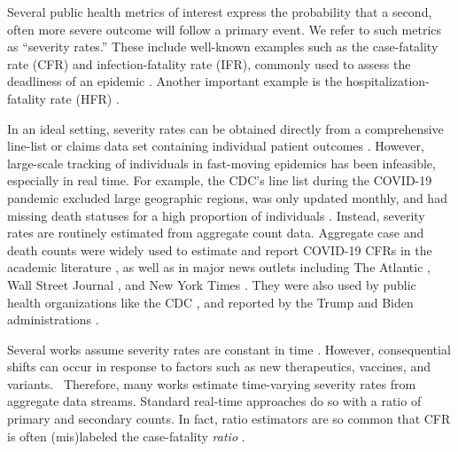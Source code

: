\documentclass{article}
\begin{document}
Several public health metrics of interest express the probability that a second,
often more severe outcome will follow a primary event. 
We refer to such metrics as ``severity rates.''
These include well-known examples such as the case-fatality rate (CFR) and infection-fatality rate (IFR), commonly used to assess the deadliness of an epidemic \citep{nishiuraEx1, nishiuraEx2, timevar_ifr, lancet_ifr}. 
Another important example 
is the hospitalization-fatality rate (HFR) \citep{HFR_linelist3, HFR_linelist1,  
  HFR_linelist2}.

In an ideal setting, severity rates can be obtained directly from a
comprehensive line-list or claims data set containing individual patient
outcomes \citep{HFR_linelist3, cfr_line_list}.
However, large-scale tracking of individuals in fast-moving epidemics
has been infeasible, especially in real time. 
For example, the CDC's line list during the COVID-19 pandemic excluded large geographic regions, was only updated monthly, and had missing death statuses for a high proportion of individuals \citep{CDC_line_list}.
Instead, severity
rates are routinely estimated from aggregate count data. 
Aggregate 
case and death counts were widely used to estimate and report COVID-19 CFRs in the academic literature \citep{yuan2020monitoring,
  horita2022global, LIU2023100350, germany}, as well as in major news outlets including
The Atlantic \citep{atlantic}, Wall Street Journal \citep{wsj}, and New York Times \citep{nyt}. 
They were also used by public health organizations like the CDC \citep{ahmad2023covid,mississippi}, and reported by the Trump and Biden administrations \citep{whitehouse2020mcenany, whitehouse2021briefing}. 


Several works 
assume severity rates are constant in time \citep{nishiuraEx1, ghani, jewell2007nonparametric, reich2012estimating, lancet_controversial}. However, 
consequential shifts can occur in response to factors 
such as new therapeutics, vaccines, and variants. 
Therefore, many works estimate time-varying severity rates from aggregate data streams.
Standard real-time approaches do so with a ratio of primary and secondary counts.
In fact, ratio estimators are so common that CFR is often 
(mis)labeled the case-fatality \emph{ratio} \citep{timevar_ifr}. 
\end{document}
